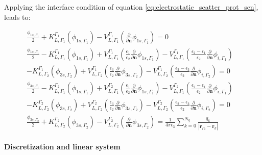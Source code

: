Applying the interface condition of equation \eqref{eq:electrostatic_scatter_prot_sen},
leads to: 

\begin{align} \label{eq:integral_eq_lspr_nobc_system}
\frac{\phi_{1s,\Gamma_1}}{2}+ K_{L,\Gamma_1}^{\Gamma_1}(\phi_{1s,\Gamma_1}) - V_{L,\Gamma_1}^{\Gamma_1} \left(\frac{\partial}{\partial \mathbf{n}}\phi_{1s,\Gamma_1} \right) = 0 & \nonumber \\
\frac{\phi_{1s,\Gamma_1}}{2} - K_{L,\Gamma_1}^{\Gamma_1}(\phi_{1s,\Gamma_1}) + V_{L,\Gamma_1}^{\Gamma_1} \left(\frac{\epsilon_1}{\epsilon_2}\frac{\partial}{\partial \mathbf{n}}\phi_{1s,\Gamma_1} \right) - V_{L,\Gamma_1}^{\Gamma_1} \left(\frac{\epsilon_2-\epsilon_1}{\epsilon_2}\frac{\partial}{\partial \mathbf{n}}\phi_{i,\Gamma_1} \right) & \nonumber\\
 - K_{L,\Gamma_2}^{\Gamma_1}(\phi_{3s,\Gamma_2}) + V_{L,\Gamma_2}^{\Gamma_1} \left(\frac{\epsilon_3}{\epsilon_2}\frac{\partial}{\partial \mathbf{n}}\phi_{3s,\Gamma_2} \right)  - V_{L,\Gamma_2}^{\Gamma_1} \left(\frac{\epsilon_2 -\epsilon_3}{\epsilon_2}\frac{\partial}{\partial \mathbf{n}}\phi_{i,\Gamma_2} \right) = 0 &  \nonumber \\
\frac{\phi_{3s,\Gamma_1}}{2} - K_{L,\Gamma_1}^{\Gamma_2}(\phi_{1s,\Gamma_1}) + V_{L,\Gamma_1}^{\Gamma_2} \left(\frac{\epsilon_1}{\epsilon_2}\frac{\partial}{\partial \mathbf{n}}\phi_{1s,\Gamma_1} \right) - V_{L,\Gamma_1}^{\Gamma_2} \left(\frac{\epsilon_2-\epsilon_1}{\epsilon_2}\frac{\partial}{\partial \mathbf{n}}\phi_{i,\Gamma_1} \right) & \nonumber\\
 - K_{L,\Gamma_2}^{\Gamma_2}(\phi_{3s,\Gamma_2}) + V_{L,\Gamma_2}^{\Gamma_2} \left(\frac{\epsilon_3}{\epsilon_2}\frac{\partial}{\partial \mathbf{n}}\phi_{3s,\Gamma_2} \right)  - V_{L,\Gamma_2}^{\Gamma_2} \left(\frac{\epsilon_2 -\epsilon_3}{\epsilon_2}\frac{\partial}{\partial \mathbf{n}}\phi_{i,\Gamma_2} \right) = 0 &  \nonumber \\
\frac{\phi_{3s,\Gamma_2}}{2} + K_{L,\Gamma_2}^{\Gamma_2}(\phi_{3s,\Gamma_2}) - V_{L,\Gamma_2}^{\Gamma_2} \left( \frac{\partial}{\partial \mathbf{n}} \phi_{3s,\Gamma_2} \right) = \frac{1}{4\pi\epsilon_3} \sum_{k=0}^{N_q} \frac{q_k}{|\mathbf{r}_{\Gamma_2} - \mathbf{r}_k|} &
\end{align}


\paragraph{Discretization and linear system}

